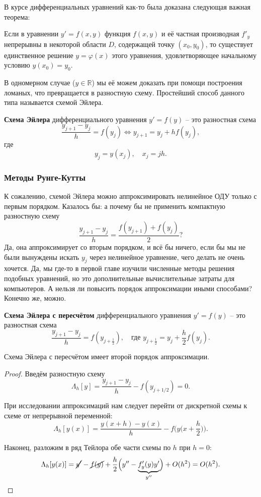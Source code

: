 \documentclass[../main.tex]{subfile}
\begin{document}
В курсе дифференциальных уравнений как-то была доказана следующая важная
теорема:

\begin{theorem}
	Если в уравнении $y'=f(x,y)$ функция $f(x,y)$ и её частная производная
	$f'_y$ непрерывны в некоторой области $D$, содержащей точку $(x_0,
	y_0)$, то существует единственное решение $y=\varphi(x)$ этого
	уравнения, удовлетворяющее начальному условию $y(x_0)=y_0$.
\end{theorem}

В одномерном случае ($y\in \mathbb R$) мы её можем доказать при помощи
построения ломаных, что превращается в разностную схему. Простейший способ
данного типа называется схемой Эйлера.

\begin{define}
	\textbf{Схема Эйлера} дифференциального уравнения $y'=f(y)$ -- это
	разностная схема
	\[\frac{y_{j+1}-y_j}{h}=f(y_j)\Leftrightarrow y_{j+1}=y_j+hf(y_j),\]
	где
	\[y_j=y(x_j),\quad x_j=jh.\]
\end{define}

\subsubsection{Методы Рунге-Кутты}
К сожалению, схемой Эйлера можно аппроксимировать нелинейное ОДУ только с первым
порядком. Казалось бы: а почему бы не применить компактную разностную схему
\[\frac{y_{j+1}-y_j}{h}=\frac{f(y_{j+1})+f(y_j)}{2}?\]
Да, она аппроксимирует со вторым порядком, и всё бы ничего, если бы мы не были
вынуждены искать $y_j$ через нелинейное уравнение, чего делать не очень хочется.
Да, мы где-то в первой главе изучили численные методы решения подобных уравнений,
но это дополнительные вычислительные затраты для компьютеров. А нельзя ли
повысить порядок аппроксимации иными способами? Конечно же, можно.

\begin{define}
	\textbf{Схема Эйлера с пересчётом} дифференциального уравнения $y'=f(y)$
	-- это разностная схема
	\[\frac{y_{j+1}-y_j}{h}=f(y_{j+\frac{1}{2}}),\quad\text{где }
	y_{j+\frac{1}{2}}=y_j+\frac{h}{2}f(y_j).\]
\end{define}

\begin{theorem}
	Схема Эйлера с пересчётом имеет второй порядок аппроксимации.
\end{theorem}

\begin{proof}
	Введём разностную схему
	\[\Lambda_h[y]=\frac{y_{j+1}-y_j}{h}-f(y_{j+1/2})=0.\]

	При исследовании аппроксимаций нам следует перейти от дискретной схемы к
	схеме от непрерывной переменной:
	\[\Lambda_h[y(x)]=\frac{y(x+h)-y(x)}{h}-f\Big(y\big(x+\frac{h}{2}\big)
	\Big).\]

	Наконец, разложим в ряд Тейлора обе части схемы по $h$ при $h=0$:
	\[\Lambda_h[y(x)]=\cancel{y'}-\cancel{f(y)}+\frac{h}{2}\Big(y''-
	\underset{y''}{\underbrace{f'_y(y)y'}}\Big)+O(h^2)=O(h^2).\]
\end{proof}
\end{document}
